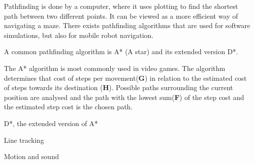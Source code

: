 Pathfinding is done by a computer, where it uses plotting to find the shortest path between two different points. It can be viewed as a more efficient way of navigating a maze.
There exists pathfinding algorithms that are used for software simulations, but also for mobile robot navigation. 

A common pathfinding algorithm is A* (A star) and its extended version D*.

The A* algorithm is most commonly used in video games. The algorithm determines that cost of steps per movement(\textbf{G}) in relation to the estimated cost  of steps towards its destination (\textbf{H}). Possible paths surrounding the current position are analysed and the path with the lowest sum(\textbf{F}) of the step cost and the estimated step cost is the chosen path.\cite{astar}


D*, the extended version of A*


Line tracking

Motion and sound




